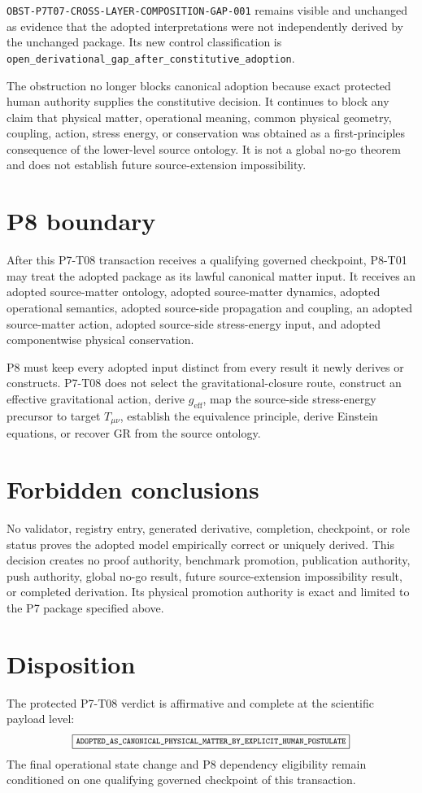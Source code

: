 \documentclass[11pt]{article}
\newcommand{\Verdict}{{\scriptsize\texttt{ADOPTED\_AS\_CANONICAL\_PHYSICAL\_MATTER\_BY\_EXPLICIT\_HUMAN\_POSTULATE}}}
\newcommand{\Obstruction}{\texttt{OBST-P7T07-CROSS-LAYER-COMPOSITION-GAP-001}}
\begin{document}
\Obstruction{} remains visible and unchanged as evidence that the adopted
interpretations were not independently derived by the unchanged package.  Its
new control classification is
\texttt{open\_derivational\_gap\_after\_constitutive\_adoption}.

The obstruction no longer blocks canonical adoption because exact protected
human authority supplies the constitutive decision.  It continues to block
any claim that physical matter, operational meaning, common physical
geometry, coupling, action, stress energy, or conservation was obtained as a
first-principles consequence of the lower-level source ontology.  It is not a
global no-go theorem and does not establish future source-extension
impossibility.

\section{P8 boundary}

After this P7-T08 transaction receives a qualifying governed checkpoint,
P8-T01 may treat the adopted package as its lawful canonical matter input.  It
receives an adopted source-matter ontology, adopted source-matter dynamics,
adopted operational semantics, adopted source-side propagation and coupling,
an adopted source-matter action, adopted source-side stress-energy input, and
adopted componentwise physical conservation.

P8 must keep every adopted input distinct from every result it newly derives
or constructs.  P7-T08 does not select the gravitational-closure route,
construct an effective gravitational action, derive $g_{\mathrm{eff}}$, map
the source-side stress-energy precursor to target $T_{\mu\nu}$, establish the
equivalence principle, derive Einstein equations, or recover GR from the
source ontology.

\section{Forbidden conclusions}

No validator, registry entry, generated derivative, completion, checkpoint,
or role status proves the adopted model empirically correct or uniquely
derived.  This decision creates no proof authority, benchmark promotion,
publication authority, push authority, global no-go result, future
source-extension impossibility result, or completed derivation.  Its physical
promotion authority is exact and limited to the P7 package specified above.

\section{Disposition}

The protected P7-T08 verdict is affirmative and complete at the scientific
payload level:
\[
  \boxed{\Verdict}
\]
The final operational state change and P8 dependency eligibility remain
conditioned on one qualifying governed checkpoint of this transaction.
\end{document}
